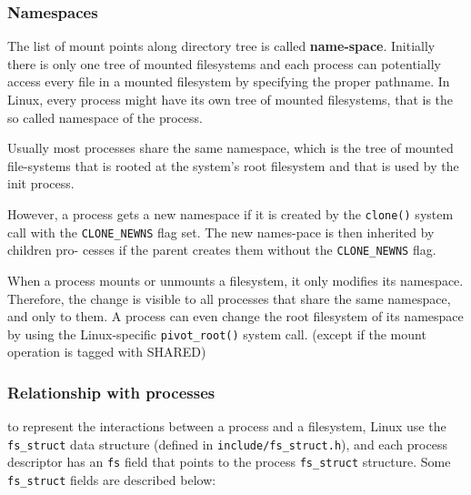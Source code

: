 \documentclass[10pt,a4paper]{article}
\begin{document}
\subsubsection{Namespaces}

The list of mount points along directory tree is called \textbf{name-space}. Initially there is only one tree of mounted filesystems and each process can potentially access every file in a
mounted filesystem by specifying the proper pathname. In Linux, every process might have its own tree of mounted filesystems, that is the so called namespace of the process.


Usually most processes share the same namespace, which is the tree of mounted file-systems that is rooted at the system’s root filesystem and that is used by the init process. 

However, a process gets a new namespace if it is created by the \texttt{clone()} system call with the \texttt{CLONE\_NEWNS} flag set. The new names-pace is then inherited by children pro-
cesses if the parent creates them without the \texttt{CLONE\_NEWNS} flag.

When a process mounts or unmounts a filesystem, it only modifies its namespace. Therefore, the change is visible to all processes that share the same namespace, and only to them. A process can even change the root filesystem of its namespace by using the Linux-specific \texttt{pivot\_root()} system call. (except if the
mount operation is tagged with SHARED)

\subsubsection{Relationship with processes}

to represent the interactions between a process and a filesystem, Linux use the \texttt{fs\_struct} data structure (defined in \texttt{include/fs\_struct.h}), and each process descriptor has an \texttt{fs} field that points to the process \texttt{fs\_struct} structure. Some \texttt{fs\_struct} fields are described below:
\end{document}

